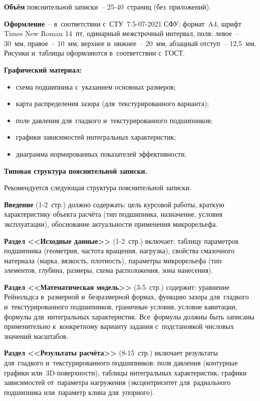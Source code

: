 \textbf{Объём} пояснительной записки~-- 25-40~страниц (без~приложений).

\textbf{Оформление}~-- в~соответствии с~СТУ~7.5-07-2021 СФУ: формат~A4, шрифт Times New Roman 14~пт, одинарный межстрочный интервал, поля: левое~-- 30~мм, правое~-- 10~мм, верхнее и~нижнее~-- 20~мм, абзацный отступ~-- 12,5~мм. Рисунки и~таблицы оформляются в~соответствии с~ГОСТ.

\textbf{Графический материал:}
\begin{itemize}
\item схема подшипника с~указанием основных размеров;
\item карта распределения зазора (для~текстурированного варианта);
\item поле давления для~гладкого и~текстурированного подшипников;
\item графики зависимостей интегральных характеристик;
\item диаграмма нормированных показателей эффективности.
\end{itemize}

\textbf{Типовая структура пояснительной записки.}

Рекомендуется следующая структура пояснительной записки.

\textbf{Введение} (1-2~стр.) должно содержать: цель курсовой работы, краткую характеристику объекта расчёта (тип подшипника, назначение, условия эксплуатации), обоснование актуальности применения микрорельефа.

\textbf{Раздел <<Исходные данные>>} (1-2~стр.) включает: таблицу параметров подшипника (геометрия, частота вращения, нагрузка), свойства смазочного материала (марка, вязкость, плотность), параметры микрорельефа (тип элементов, глубина, размеры, схема расположения, зона нанесения).

\textbf{Раздел <<Математическая модель>>} (3-5~стр.) содержит: уравнение Рейнольдса в~размерной и~безразмерной формах, функцию зазора для~гладкого и~текстурированного подшипников, граничные условия, условие кавитации, формулы для~интегральных характеристик. Все~формулы должны быть записаны применительно к~конкретному варианту задания с~подстановкой числовых значений масштабов.

\textbf{Раздел <<Результаты расчёта>>} (8-15~стр.) включает результаты для~гладкого и~текстурированного подшипников: поля давления (контурные графики или~3D-поверхности), таблицы интегральных характеристик, графики зависимостей от~параметра нагружения (эксцентриситет для~радиального подшипника или~параметр клина для~упорного).


